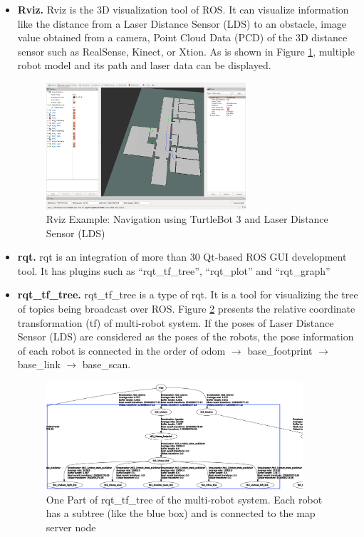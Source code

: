 \begin{itemize}
 \item \textbf{Rviz.} Rviz\cite{RVIZ} is the 3D visualization tool of ROS. It can visualize information like the distance from a Laser Distance Sensor (LDS) to an obstacle, image value obtained from a camera, Point Cloud Data (PCD) of the 3D distance sensor such as RealSense, Kinect, or Xtion. As is shown in Figure \ref{fig:Rviz_gui}, multiple robot model and its path and laser data can be displayed.
 \begin{figure}[htbp]
 \centering
 \includegraphics[width = 0.7\textwidth]{content/images/ch2/Rviz_gui.png}
 \caption{Rviz Example: Navigation using TurtleBot 3 and Laser Distance Sensor (LDS)}
 \label{fig:Rviz_gui}
 \end{figure}

 \item \textbf{rqt.} rqt is an integration of more than 30 Qt-based ROS GUI development tool. It has plugins such as ``rqt\_tf\_tree'', ``rqt\_plot'' and ``rqt\_graph''
 
 \item \textbf{rqt\_tf\_tree.} rqt\_tf\_tree is a type of rqt. It is a tool for visualizing the tree of topics being broadcast over ROS. Figure \ref{fig:tf_tree} presents the relative coordinate transformation (tf) of multi-robot system. If the poses of Laser Distance Sensor (LDS) are considered as the poses of the robots, the pose information of each robot is connected in the order of odom $\rightarrow$ base\_footprint $\rightarrow$ base\_link $\rightarrow$ base\_scan.
 
 \begin{figure}[htbp]
 \centering
 \includegraphics[width = 0.9\textwidth]{content/images/ch2/rqt_tree.png}
 \caption{One Part of rqt\_tf\_tree of the multi-robot system. Each robot has a subtree (like the blue box) and is connected to the map server node }
 \label{fig:tf_tree}
 \end{figure}
 

\end{itemize}
